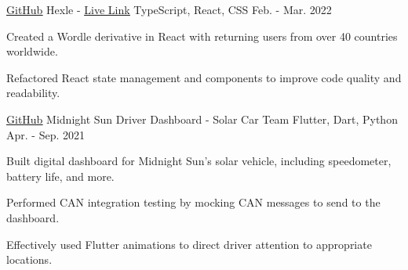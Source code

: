 

\begin{cventries}

  \cventry
    {\href{https://github.com/frankljin/hexle/}{\underline{GitHub}}} %
    {Hexle - \href{https://frankljin.github.io/hexle/}{\underline{Live Link}}} %
    {TypeScript, React, CSS} %
    {Feb. - Mar. 2022} %
    {
      \begin{cvitems} %
        \item {Created a Wordle derivative in React with returning users from over 40 countries worldwide.}
        \item {Refactored React state management and components to improve code quality and readability.}
      \end{cvitems}
    }

  \cventry
    {\href{https://github.com/uw-midsun/telemetry_xiv}{\underline{GitHub}}} %
    {Midnight Sun Driver Dashboard - Solar Car Team} %
    {Flutter, Dart, Python} %
    {Apr. - Sep. 2021} %
    {
      \begin{cvitems} %
        \item {Built digital dashboard for Midnight Sun's solar vehicle, including speedometer, battery life, and more.}
        \item {Performed CAN integration testing by mocking CAN messages to send to the dashboard.}
        \item {Effectively used Flutter animations to direct driver attention to appropriate locations.}
      \end{cvitems}
    }



\end{cventries}
